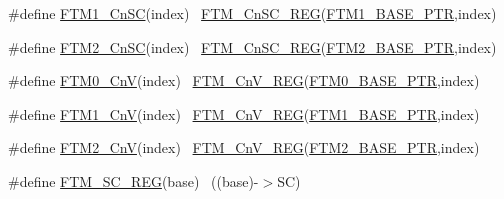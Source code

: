 \begin{DoxyCompactItemize}
\item 
\#define \hyperlink{group___f_t_m___register___accessor___macros_ga4626b0d954c6e9c9655ff5ebe49aa7e6}{F\+T\+M1\+\_\+\+Cn\+SC}(index)                                              ~\hyperlink{group___f_t_m___register___accessor___macros_ga49332bccc11dd36d399f3fff66f313b5}{F\+T\+M\+\_\+\+Cn\+S\+C\+\_\+\+R\+EG}(\hyperlink{group___f_t_m___peripheral_ga38115fba8eadfc94b2fc411f45906002}{F\+T\+M1\+\_\+\+B\+A\+S\+E\+\_\+\+P\+TR},index)
\item 
\#define \hyperlink{group___f_t_m___register___accessor___macros_gae283505ba41ed3c3212632a3d646ee31}{F\+T\+M2\+\_\+\+Cn\+SC}(index)                                              ~\hyperlink{group___f_t_m___register___accessor___macros_ga49332bccc11dd36d399f3fff66f313b5}{F\+T\+M\+\_\+\+Cn\+S\+C\+\_\+\+R\+EG}(\hyperlink{group___f_t_m___peripheral_ga897564efeaf1be1f991305d294eda3d6}{F\+T\+M2\+\_\+\+B\+A\+S\+E\+\_\+\+P\+TR},index)
\item 
\#define \hyperlink{group___f_t_m___register___accessor___macros_gafa3100e71e0145e36d896e8061a931ad}{F\+T\+M0\+\_\+\+CnV}(index)                                                ~\hyperlink{group___f_t_m___register___accessor___macros_gaacf8fed24da463653900319184874197}{F\+T\+M\+\_\+\+Cn\+V\+\_\+\+R\+EG}(\hyperlink{group___f_t_m___peripheral_gae712c29b7abcf338d8f8f6418683fa66}{F\+T\+M0\+\_\+\+B\+A\+S\+E\+\_\+\+P\+TR},index)
\item 
\#define \hyperlink{group___f_t_m___register___accessor___macros_ga24fb80c2d6dbb122dce1c2eebe041d1d}{F\+T\+M1\+\_\+\+CnV}(index)                                                ~\hyperlink{group___f_t_m___register___accessor___macros_gaacf8fed24da463653900319184874197}{F\+T\+M\+\_\+\+Cn\+V\+\_\+\+R\+EG}(\hyperlink{group___f_t_m___peripheral_ga38115fba8eadfc94b2fc411f45906002}{F\+T\+M1\+\_\+\+B\+A\+S\+E\+\_\+\+P\+TR},index)
\item 
\#define \hyperlink{group___f_t_m___register___accessor___macros_gaade79f672ad080d530a40665a662cd0f}{F\+T\+M2\+\_\+\+CnV}(index)                                                ~\hyperlink{group___f_t_m___register___accessor___macros_gaacf8fed24da463653900319184874197}{F\+T\+M\+\_\+\+Cn\+V\+\_\+\+R\+EG}(\hyperlink{group___f_t_m___peripheral_ga897564efeaf1be1f991305d294eda3d6}{F\+T\+M2\+\_\+\+B\+A\+S\+E\+\_\+\+P\+TR},index)
\item 
\#define \hyperlink{group___f_t_m___register___accessor___macros_ga0b48df6cbccecf754cc49bb7ea1e3aad}{F\+T\+M\+\_\+\+S\+C\+\_\+\+R\+EG}(base)                                              ~((base)-\/$>$SC)

\end{DoxyCompactItemize}
